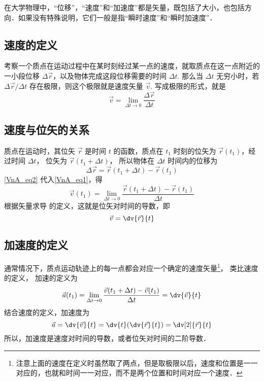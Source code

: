 

在大学物理中，“位移”，“速度”和“加速度”都是矢量，既包括了大小，也包括方向．如果没有特殊说明，它们一般是指“瞬时速度”和“瞬时加速度”．

\subsection{速度的定义}
考察一个质点在运动过程中在某时刻经过某一点的速度，就取质点在这一点附近的一小段位移 $\Delta\vec r$，以及物体完成这段位移需要的时间 $\Delta t$. 那么当 $\Delta t$ 无穷小时，若 $\Delta \vec r/\Delta t$ 存在极限，则这个极限就是速度矢量 $\vec v$. 写成极限的形式，就是
\begin{equation}\label{VnA_eq1}
\vec v = \mathop {\lim }\limits_{\Delta t \to 0} \frac{{\Delta \vec r}}{{\Delta t}}
\end{equation}

\subsection{速度与位矢的关系}

质点在运动时，其位矢 $\vec r$ 是时间 $t$ 的函数，质点在 ${t_1}$ 时刻的位矢为 $\vec r(t_1)$，经过时间 $\Delta t$， 位矢为 $\vec r(t_1 + \Delta t)$， 所以物体在 $\Delta t$ 时间内的位移为
\begin{equation}\label{VnA_eq2}
\Delta \vec r = \vec r (t_1 + \Delta t) - \vec r (t_1)
\end{equation}
\autoref{VnA_eq2} 代入\autoref{VnA_eq1}，得
\begin{equation}\label{VnA_eq3}
\vec v(t_1) = \mathop {\lim }\limits_{\Delta t \to 0} \frac{{\vec r (t_1 + \Delta t) - \vec r(t_1)}}{{\Delta t}}
\end{equation}
根据矢量求导 的定义，这就是位矢对时间的导数，即
\begin{equation}
\vec v = \dv{\vec r}{t}
\end{equation}


\subsection{加速度的定义}

通常情况下，质点运动轨迹上的每一点都会对应一个确定的速度矢量\footnote{注意上面的速度在定义时虽然取了两点，但是取极限以后，速度和位置是一一对应的，也就和时间一一对应，而不是两个位置和时间对应一个速度．}， 类比速度的定义， 加速的定义为
\begin{equation}
\vec a(t_1) = \lim_{\Delta t \to 0} \frac{{\vec v(t_1 + \Delta t) - \vec v (t_1)}}{{\Delta t}} = \dv{\vec v}{t}
\end{equation}
结合速度的定义，加速度为
\begin{equation}
\vec a = \dv{\vec v}{t} = \dv{t} (\dv{\vec r}{t}) = \dv[2]{\vec r}{t}
\end{equation}
所以，加速度是速度对时间的导数，或者位矢对时间的二阶导数．

